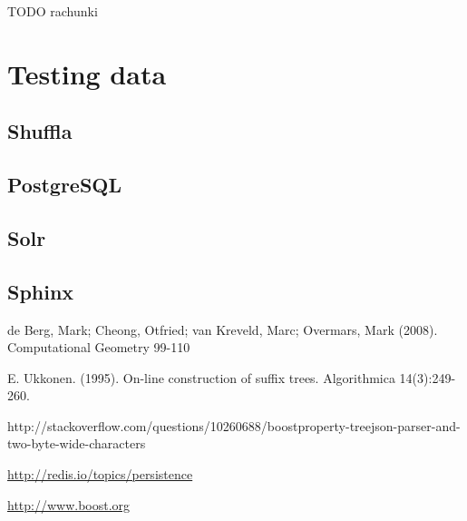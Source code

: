 \documentclass[10pt,a4paper]{article}
\begin{document}
TODO rachunki


\section{Testing data}
\subsection{Shuffla}
\subsection{PostgreSQL}
\subsection{Solr}
\subsection{Sphinx}



\begin{thebibliography}{99}

 de Berg, Mark; Cheong, Otfried; van Kreveld, Marc; Overmars, Mark (2008). Computational Geometry 99-110

 E. Ukkonen. (1995). On-line construction of suffix trees. Algorithmica 14(3):249-260.

 http://stackoverflow.com/questions/10260688/boostproperty-treejson-parser-and-two-byte-wide-characters

 \url{http://redis.io/topics/persistence}

 \url{http://www.boost.org}
\end{thebibliography}
\end{document}

